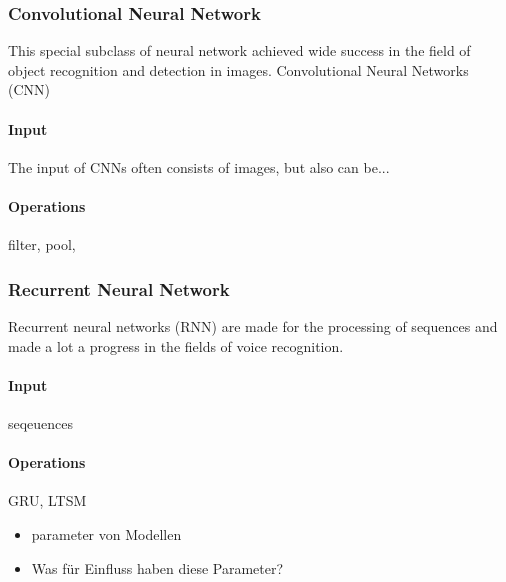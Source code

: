 \subsubsection{Convolutional Neural Network}
This special subclass of neural network achieved wide success in the field of object recognition and detection in images. Convolutional Neural Networks (CNN)
\paragraph{Input}
The input of CNNs often consists of images, but also can be...

\paragraph{Operations}
filter, pool, 
\subsubsection{Recurrent Neural Network}
Recurrent neural networks (RNN) are made for the processing of sequences and made a lot a progress in the fields of voice recognition.
\paragraph{Input}
seqeuences
\paragraph{Operations}
GRU, LTSM
\begin{itemize}
    \item parameter von Modellen
    \item Was für Einfluss haben diese Parameter?
\end{itemize}


